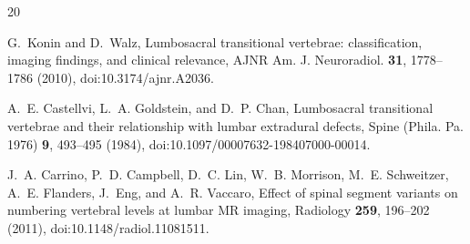 \documentclass[aapm,mph,amsmath,amssymb,preprint,linenumbers]{revtex4-2}
\newif\ifreview \reviewtrue
\begin{document}
\begin{thebibliography}{20}
%
%
\sloppy

G.~Konin and D.~Walz,
\newblock Lumbosacral transitional vertebrae: classification, imaging findings, and clinical relevance,
\newblock AJNR Am. J. Neuroradiol. {\bf 31}, 1778--1786 (2010),
\newblock doi:10.3174/ajnr.A2036.

A.~E. Castellvi, L.~A. Goldstein, and D.~P. Chan,
\newblock Lumbosacral transitional vertebrae and their relationship with lumbar extradural defects,
\newblock Spine (Phila. Pa. 1976) {\bf 9}, 493--495 (1984),
\newblock doi:10.1097/00007632-198407000-00014.

J.~A. Carrino, P.~D. Campbell, D.~C. Lin, W.~B. Morrison, M.~E. Schweitzer, A.~E. Flanders, J.~Eng, and A.~R. Vaccaro,
\newblock Effect of spinal segment variants on numbering vertebral levels at lumbar {MR} imaging,
\newblock Radiology {\bf 259}, 196--202 (2011),
\newblock doi:10.1148/radiol.11081511.


\end{thebibliography}
\end{document}
